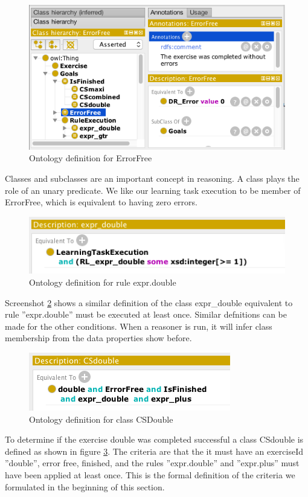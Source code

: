 \begin{figure}
\includegraphics[scale=0.7]{pictures/screen04.png}
\caption{Ontology definition for ErrorFree}
\label{fig:onto01}
\end{figure}

Classes and subclasses are an important concept in reasoning. 
A class plays the role of an unary predicate. We like our learning task execution to be member of ErrorFree, which is equivalent to having zero errors.


\begin{figure}
\includegraphics[scale=0.7]{pictures/screen05.png}
\caption{Ontology definition for rule expr.double}
\label{fig:onto02}
\end{figure}

Screenshot \ref{fig:onto02} shows a similar definition of the class expr\_double equivalent to rule ''expr.double'' must be executed at least once.
Similar defnitions can be made for the other conditions. 
When a reasoner is run, it will infer class membership from the data properties show before.



\begin{figure}
\includegraphics[scale=0.7]{pictures/screen06.png}
\caption{Ontology definition for class CSDouble}
\label{fig:onto03}
\end{figure}
To determine if the exercise double was completed successful a class CSdouble is defined as shown in figure \ref{fig:onto03}.
The criteria are that the it must have an exerciseId ''double'', error free, finished, and the rules ''expr.double'' and ''expr.plus'' must have been applied at least once. This is the formal definition of the criteria we formulated in the beginning of this section.

